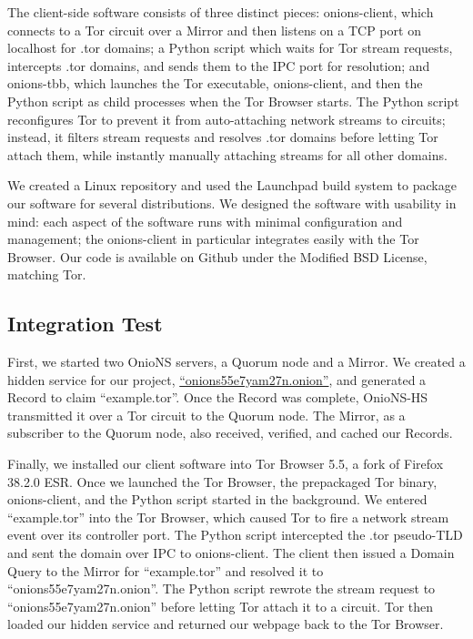 \documentclass[USenglish,oneside,twocolumn]{article}
\begin{document}
The client-side software consists of three distinct pieces: onions-client, which connects to a Tor circuit over a Mirror and then listens on a TCP port on localhost for .tor domains; a Python script which waits for Tor stream requests, intercepts .tor domains, and sends them to the IPC port for resolution; and onions-tbb, which launches the Tor executable, onions-client, and then the Python script as child processes when the Tor Browser starts. The Python script reconfigures Tor to prevent it from auto-attaching network streams to circuits; instead, it filters stream requests and resolves .tor domains before letting Tor attach them, while instantly manually attaching streams for all other domains.

We created a Linux repository and used the Launchpad build system to package our software for several distributions. We designed the software with usability in mind: each aspect of the software runs with minimal configuration and management; the onions-client in particular integrates easily with the Tor Browser. Our code is available on Github under the Modified BSD License, matching Tor.

\subsection{Integration Test}

First, we started two OnioNS servers, a Quorum node and a Mirror. We created a hidden service for our project, \href{http://onions55e7yam27n.onion}{``onions55e7yam27n.onion''}, and generated a Record to claim ``example.tor''. Once the Record was complete, OnioNS-HS transmitted it over a Tor circuit to the Quorum node. The Mirror, as a subscriber to the Quorum node, also received, verified, and cached our Records.

Finally, we installed our client software into Tor Browser 5.5, a fork of Firefox 38.2.0 ESR. Once we launched the Tor Browser, the prepackaged Tor binary, onions-client, and the Python script started in the background. We entered ``example.tor'' into the Tor Browser, which caused Tor to fire a network stream event over its controller port. The Python script intercepted the .tor pseudo-TLD and sent the domain over IPC to onions-client. The client then issued a Domain Query to the Mirror for ``example.tor'' and resolved it to ``onions55e7yam27n.onion''. The Python script rewrote the stream request to ``onions55e7yam27n.onion'' before letting Tor attach it to a circuit. Tor then loaded our hidden service and returned our webpage back to the Tor Browser.
\end{document}
